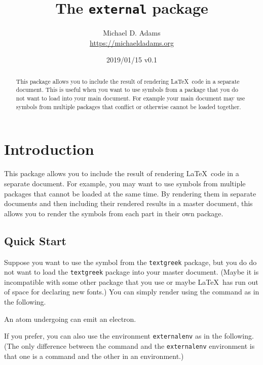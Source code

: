 \documentclass[10pt]{ltxdoc}
\newcommand{\env}[1]{\texttt{#1}}
\newcommand{\pkg}[1]{\texttt{#1}}
\begin{document}
\title{The \pkg{external} package}
\author{Michael D. Adams\\\url{https://michaeldadams.org}}
\date{2019/01/15 v0.1}
\maketitle

\begin{abstract}
This package allows you to include the result of rendering \LaTeX\ code
in a separate document.
This is useful when you want to use symbols from a package that you do
not want to load into your main document.
For example your main document may use symbols from multiple packages
that conflict or otherwise cannot be loaded together.
\end{abstract}

\section{Introduction}
\label{sec:Introduction}

This package allows you to include the result of rendering \LaTeX\ code
in a separate document.
For example, you may want to use symbols from multiple packages that
cannot be loaded at the same time.
By rendering them in separate documents and then including their
rendered results in a master document, this allows you to render the
symbols from each part in their own package.

\subsection{Quick Start}
\label{subsec:Quick Start}

Suppose you want to use the  symbol from the
\pkg{textgreek} package, but you do do not want to load the
\pkg{textgreek} package into your master document.
(Maybe it is incompatible with some other package that you use or maybe
\LaTeX\ has run out of space for declaring new fonts.)
You can simply render  using the  command as
in the following.

\begin{tcblisting}{}
An atom undergoing
can emit an electron.
\end{tcblisting}

If you prefer, you can also use the environment \env{externalenv} as in the
following.
(The only difference between the  command and the
\env{externalenv} environment is that one is a command and the other in
an environment.)
\end{document}
